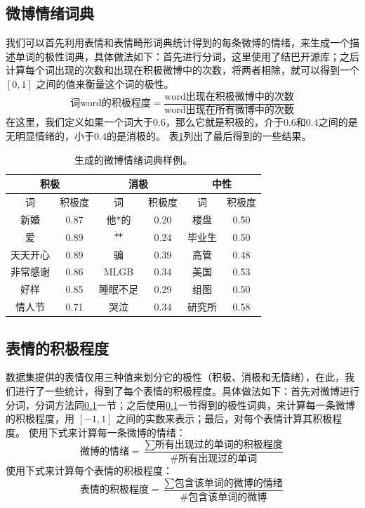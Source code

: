 \documentclass[12pt, oneside]{article}
\begin{document}
\begin{spacing}{1.5}
\begin{CJK}{UTF8}{gbsn}
\subsection{微博情绪词典}
\label{subsec:polar_dict}
我们可以首先利用表情和表情畸形词典统计得到的每条微博的情绪，来生成一个描述单词的极性词典，具体做法如下：首先进行分词，这里使用了结巴开源库；之后计算每个词出现的次数和出现在积极微博中的次数，将两者相除，就可以得到一个 $[0, 1]$ 之间的值来衡量这个词的极性。
$$\text{词word的积极程度}= \frac{\text{word出现在积极微博中的次数}}{\text{word出现在所有微博中的次数}}$$
在这里，我们定义如果一个词大于0.6，那么它就是积极的，介于0.6和0.4之间的是无明显情绪的，小于0.4的是消极的。
表\ref{tbl:polar_dict}列出了最后得到的一些结果。

\begin{table}[]
\centering
\begin{tabular}{|c|c|c|c|c|c|}
\hline
\multicolumn{2}{|c|}{积极} & \multicolumn{2}{c|}{消极} & \multicolumn{2}{c|}{中性} \\ \hline
词           & 积极度        & 词          & 积极度        & 词          & 积极度        \\ \hline
新婚          & 0.87       & 他*的        & 0.20       & 楼盘         & 0.50       \\ \hline
爱           & 0.89       & 艹          & 0.24       & 毕业生        & 0.50       \\ \hline
天天开心        & 0.89       & 骗          & 0.39       & 高管         & 0.48       \\ \hline
非常感谢        & 0.86       & MLGB       & 0.34       & 美国         & 0.53       \\ \hline
好样          & 0.85       & 睡眠不足       & 0.29       & 组图         & 0.50       \\ \hline
情人节         & 0.71       & 哭泣         & 0.34       & 研究所        & 0.58       \\ \hline
\end{tabular}
\caption{生成的微博情绪词典样例。}
\label{tbl:polar_dict}
\end{table}

\subsection{表情的积极程度}
数据集提供的表情仅用三种值来划分它的极性（积极、消极和无情绪），在此，我们进行了一些统计，得到了每个表情的积极程度。具体做法如下：首先对微博进行分词，分词方法同\ref{subsec:polar_dict}一节；之后使用\ref{subsec:polar_dict}一节得到的极性词典，来计算每一条微博的积极程度，用 $[-1, 1]$ 之间的实数来表示；最后，对每个表情计算其积极程度。
使用下式来计算每一条微博的情绪：
$$\text{微博的情绪} = \frac{\sum{\text{所有出现过的单词的积极程度}}}{\text{\#所有出现过的单词}}$$
使用下式来计算每个表情的积极程度：
$$\text{表情的积极程度} = \frac{\sum{\text{包含该单词的微博的情绪}}}{\text{\#包含该单词的微博}}$$


\end{CJK}
\end{spacing}
\end{document}
